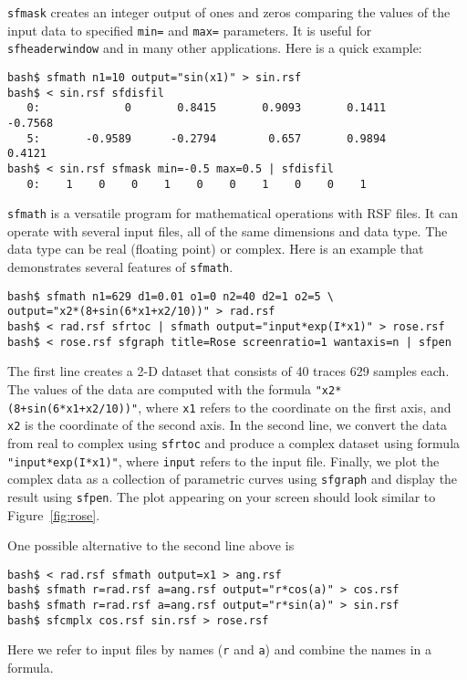 \noindent\doublebox{\parbox{\textwidth}{
    
  }}

\texttt{sfmask} creates an integer output of ones and zeros comparing
the values of the input data to specified \texttt{min=} and
\texttt{max=} parameters. It is useful for \texttt{sfheaderwindow} and
in many other applications. Here is a quick example:
\begin{verbatim}
bash$ sfmath n1=10 output="sin(x1)" > sin.rsf
bash$ < sin.rsf sfdisfil
   0:             0       0.8415       0.9093       0.1411      -0.7568
   5:       -0.9589      -0.2794        0.657       0.9894       0.4121
bash$ < sin.rsf sfmask min=-0.5 max=0.5 | sfdisfil
   0:    1    0    0    1    0    0    1    0    0    1
\end{verbatim}

\noindent\doublebox{\parbox{\textwidth}{
    
  }}


\texttt{sfmath} is a versatile program for mathematical operations
with RSF files. It can operate with several input files, all of the
same dimensions and data type. The data type can be real (floating
point) or complex. Here is an example that demonstrates several
features of \texttt{sfmath}.
\begin{verbatim}
bash$ sfmath n1=629 d1=0.01 o1=0 n2=40 d2=1 o2=5 \
output="x2*(8+sin(6*x1+x2/10))" > rad.rsf
bash$ < rad.rsf sfrtoc | sfmath output="input*exp(I*x1)" > rose.rsf
bash$ < rose.rsf sfgraph title=Rose screenratio=1 wantaxis=n | sfpen
\end{verbatim}

The first line creates a 2-D dataset that consists of 40 traces 629
samples each. The values of the data are computed with the formula
\verb#"x2*(8+sin(6*x1+x2/10))"#, where \texttt{x1} refers to the
coordinate on the first axis, and \texttt{x2} is the coordinate of the
second axis. In the second line, we convert the data from real to
complex using \texttt{sfrtoc} and produce a complex dataset using
formula \verb#"input*exp(I*x1)"#, where \texttt{input} refers to the
input file. Finally, we plot the complex data as a collection of
parametric curves using \texttt{sfgraph} and display the result using
\texttt{sfpen}.  The plot appearing on your screen should look similar
to Figure~\ref{fig:rose}.


One possible alternative to the second line above is
\begin{verbatim}
bash$ < rad.rsf sfmath output=x1 > ang.rsf
bash$ sfmath r=rad.rsf a=ang.rsf output="r*cos(a)" > cos.rsf
bash$ sfmath r=rad.rsf a=ang.rsf output="r*sin(a)" > sin.rsf
bash$ sfcmplx cos.rsf sin.rsf > rose.rsf
\end{verbatim}
Here we refer to input files by names (\texttt{r} and \texttt{a}) and combine the names in a formula.


